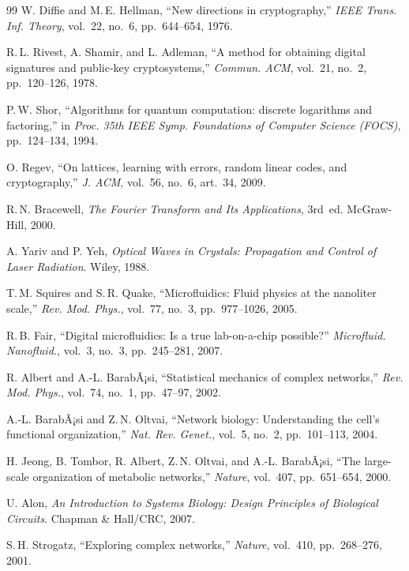 ﻿\documentclass[a4paper,12pt]{scrreprt}
\theoremstyle{definition}
\begin{document}
\begin{thebibliography}{99}
 W. Diffie and M.\,E. Hellman,
  ``New directions in cryptography,''
  \textit{IEEE Trans. Inf. Theory}, vol.~22, no.~6, pp.~644--654, 1976.

 R.\,L. Rivest, A. Shamir, and L. Adleman,
  ``A method for obtaining digital signatures and public-key cryptosystems,''
  \textit{Commun. ACM}, vol.~21, no.~2, pp.~120--126, 1978.

 P.\,W. Shor, ``Algorithms for quantum computation: discrete
  logarithms and factoring,''
  in \textit{Proc. 35th IEEE Symp. Foundations of Computer Science (FOCS)},
  pp.~124--134, 1994.

 O. Regev, ``On lattices, learning with errors, random
  linear codes, and cryptography,''
  \textit{J. ACM}, vol.~56, no.~6, art.~34, 2009.

 R.\,N. Bracewell,
  \textit{The Fourier Transform and Its Applications}, 3rd~ed.
  McGraw-Hill, 2000.

 A. Yariv and P. Yeh,
  \textit{Optical Waves in Crystals: Propagation and Control of Laser Radiation}.
  Wiley, 1988.

 T.\,M. Squires and S.\,R. Quake,
  ``Microfluidics: Fluid physics at the nanoliter scale,''
  \textit{Rev. Mod. Phys.}, vol.~77, no.~3, pp.~977--1026, 2005.

 R.\,B. Fair,
  ``Digital microfluidics: Is a true lab-on-a-chip possible?''
  \textit{Microfluid. Nanofluid.}, vol.~3, no.~3, pp.~245--281, 2007.

 R. Albert and A.-L. BarabÃ¡si,
  ``Statistical mechanics of complex networks,''
  \textit{Rev. Mod. Phys.}, vol.~74, no.~1, pp.~47--97, 2002.

 A.-L. BarabÃ¡si and Z.\,N. Oltvai,
  ``Network biology: Understanding the cell's functional organization,''
  \textit{Nat. Rev. Genet.}, vol.~5, no.~2, pp.~101--113, 2004.

 H. Jeong, B. Tombor, R. Albert, Z.\,N. Oltvai,
  and A.-L. BarabÃ¡si, ``The large-scale organization of metabolic networks,''
  \textit{Nature}, vol.~407, pp.~651--654, 2000.

 U. Alon,
  \textit{An Introduction to Systems Biology: Design Principles of
  Biological Circuits}.
  Chapman \& Hall/CRC, 2007.

 S.\,H. Strogatz,
  ``Exploring complex networks,''
  \textit{Nature}, vol.~410, pp.~268--276, 2001.


\end{thebibliography}
\end{document}
